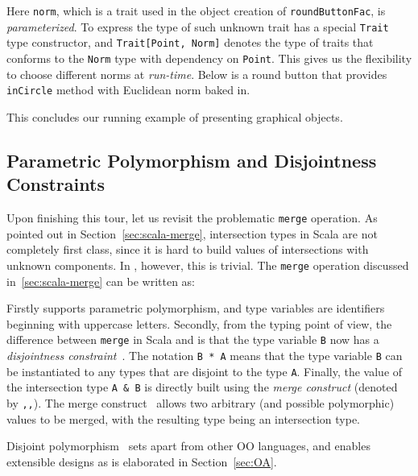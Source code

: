 \noindent Here \lstinline{norm}, which is a trait used in the object creation of
\lstinline{roundButtonFac}, is \emph{parameterized}. To express the
type of such unknown trait \name has a special 
\lstinline{Trait} type constructor, and \lstinline$Trait[Point, Norm]$
denotes the type of traits that conforms to the \lstinline$Norm$ type with dependency
on \lstinline{Point}. This gives us the
flexibility to choose different norms at \emph{run-time}. Below is a
round button that provides \lstinline{inCircle} method with Euclidean norm baked
in.

This concludes our running example of presenting graphical objects.

\subsection{Parametric Polymorphism and Disjointness Constraints}
\label{sec:merge-construct}

Upon finishing this tour, let us revisit the problematic \lstinline{merge}
operation. As pointed out in Section~\ref{sec:scala-merge}, intersection types
in Scala are not completely first class, since it is hard to build values of
intersections with unknown components. In \name, however, this is trivial. The
\lstinline{merge} operation discussed in~\ref{sec:scala-merge} can be written as:

\noindent Firstly \name supports parametric polymorphism, and type variables are
identifiers beginning with uppercase letters. Secondly, from the typing point of
view, the difference between \lstinline{merge} in Scala and \name is that the
type variable \lstinline{B} now has a \emph{disjointness
  constraint}~\cite{alpuimdisjoint}. The notation \lstinline{B * A} means that
the type variable \lstinline{B} can be instantiated to any types that are
disjoint to the type \lstinline{A}. Finally, the value of the intersection type
\lstinline{A & B} is directly built using the \textit{merge construct} (denoted
by \lstinline{,,}). The merge construct~\cite{dunfield2014elaborating} allows
two arbitrary (and possible polymorphic) values to be merged, with the resulting type
being an intersection type.

Disjoint polymorphism~\cite{alpuimdisjoint} sets apart \name
from other OO languages, and enables extensible designs as is elaborated in
Section~\ref{sec:OA}.
